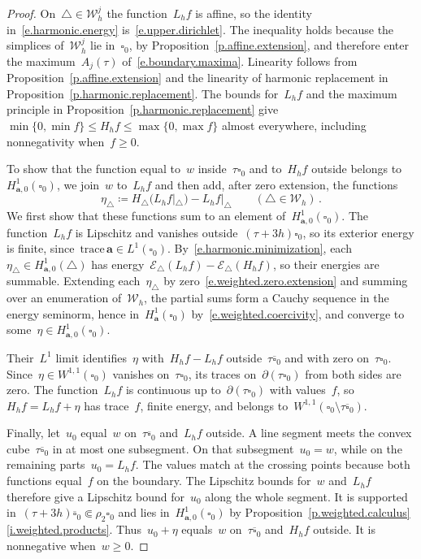 \documentclass[11pt,letterpaper]{article}
\numberwithin{equation}{section}
\theoremstyle{definition}
\renewcommand{\a}{\mathbf{a}}
\newcommand{\cu}{\square}
\newcommand*{\tr}{\mathrm{trace\,}}
\newcommand{\Ener}{\mathcal E}
\newcommand{\Hzero}[1]{H^1_{#1,0}}
\begin{document}
\begin{proof}
On~$\triangle\in\mathscr W_h^j$ the function~$L_hf$ is affine, so the identity in~\eqref{e.harmonic.energy} is~\eqref{e.upper.dirichlet}. The inequality holds because the simplices of~$\mathscr W_h^j$ lie in~$\cu_0$, by Proposition~\ref{p.affine.extension}, and therefore enter the maximum~$A_j(\tau)$ of~\eqref{e.boundary.maxima}. Linearity follows from Proposition~\ref{p.affine.extension} and the linearity of harmonic replacement in Proposition~\ref{p.harmonic.replacement}. The bounds for~$L_hf$ and the maximum principle in Proposition~\ref{p.harmonic.replacement} give~$\min\{0,\min f\}\leq H_hf\leq\max\{0,\max f\}$ almost everywhere, including nonnegativity when~$f\geq0$.

\smallskip

To show that the function equal to~$w$ inside~$\tau\cu_0$ and to~$H_hf$ outside belongs to~$\Hzero{\a}(\cu_0)$, we join~$w$ to~$L_hf$ and then add, after zero extension, the functions
\begin{equation*}
	\eta_\triangle\coloneqq H_\triangle(L_hf|_\triangle)-L_hf|_\triangle\qquad(\triangle\in\mathscr W_h)\,.
\end{equation*}
We first show that these functions sum to an element of~$\Hzero{\a}(\cu_0)$. The function~$L_hf$ is Lipschitz and vanishes outside~$(\tau+3h)\cu_0$, so its exterior energy is finite, since~$\tr\a\in L^1(\cu_0)$. By~\eqref{e.harmonic.minimization}, each~$\eta_\triangle\in\Hzero{\a}(\triangle)$ has energy~$\Ener_\triangle(L_hf)-\Ener_\triangle(H_hf)$, so their energies are summable. Extending each~$\eta_\triangle$ by zero~\eqref{e.weighted.zero.extension} and summing over an enumeration of~$\mathscr W_h$, the partial sums form a Cauchy sequence in the energy seminorm, hence in~$H^1_\a(\cu_0)$ by~\eqref{e.weighted.coercivity}, and converge to some~$\eta\in\Hzero{\a}(\cu_0)$.

Their~$L^1$ limit identifies~$\eta$ with~$H_hf-L_hf$ outside~$\tau\overline{\cu}_0$ and with zero on~$\tau\cu_0$. Since~$\eta\in W^{1,1}(\cu_0)$ vanishes on~$\tau\cu_0$, its traces on~$\partial(\tau\cu_0)$ from both sides are zero. The function~$L_hf$ is continuous up to~$\partial(\tau\cu_0)$ with values~$f$, so~$H_hf=L_hf+\eta$ has trace~$f$, finite energy, and belongs to~$W^{1,1}(\cu_0\setminus\tau\overline{\cu}_0)$.

\smallskip

Finally, let~$u_0$ equal~$w$ on~$\tau\overline{\cu}_0$ and~$L_hf$ outside. A line segment meets the convex cube~$\tau\overline{\cu}_0$ in at most one subsegment. On that subsegment~$u_0=w$, while on the remaining parts~$u_0=L_hf$. The values match at the crossing points because both functions equal~$f$ on the boundary. The Lipschitz bounds for~$w$ and~$L_hf$ therefore give a Lipschitz bound for~$u_0$ along the whole segment. It is supported in~$(\tau+3h)\overline{\cu}_0\Subset\rho_2\cu_0$ and lies in~$\Hzero{\a}(\cu_0)$ by Proposition~\ref{p.weighted.calculus}\ref{i.weighted.products}. Thus~$u_0+\eta$ equals~$w$ on~$\tau\overline{\cu}_0$ and~$H_hf$ outside. It is nonnegative when~$w\geq0$.
\end{proof}
\end{document}
